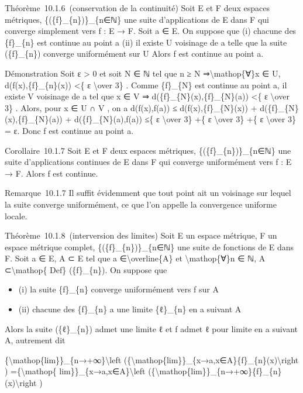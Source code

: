 \documentclass[]{article}
\begin{document}
Théorème~10.1.6~(conservation de la continuité) Soit E et F deux espaces
métriques, \{(\{f\}\_\{n\})\}\_\{n∈ℕ\} une suite d'applications de E
dans F qui converge simplement vers f : E → F. Soit a ∈ E. On suppose
que (i) chacune des \{f\}\_\{n\} est continue au point a (ii) il existe
U voisinage de a telle que la suite (\{f\}\_\{n\}) converge uniformément
sur U Alors f est continue au point a.

Démonstration Soit ε \textgreater{} 0 et soit N ∈ ℕ tel que n ≥ N
⇒\textbackslash{}mathop\{∀\}x ∈ U, d(f(x),\{f\}\_\{n\}(x)) \textless{}\{
ε \textbackslash{}over 3\} . Comme \{f\}\_\{N\} est continue au point a,
il existe V voisinage de a tel que x ∈ V ⇒
d(\{f\}\_\{N\}(x),\{f\}\_\{N\}(a)) \textless{}\{ ε \textbackslash{}over
3\} . Alors, pour x ∈ U ∩ V , on a d(f(x),f(a)) ≤
d(f(x),\{f\}\_\{N\}(x)) + d(\{f\}\_\{N\}(x),\{f\}\_\{N\}(a)) +
d(\{f\}\_\{N\}(a),f(a)) ≤\{ ε \textbackslash{}over 3\} +\{ ε
\textbackslash{}over 3\} +\{ ε \textbackslash{}over 3\} = ε. Donc f est
continue au point a.

Corollaire~10.1.7 Soit E et F deux espaces métriques,
\{(\{f\}\_\{n\})\}\_\{n∈ℕ\} une suite d'applications continues de E dans
F qui converge uniformément vers f : E → F. Alors f est continue.

Remarque~10.1.7 Il suffit évidemment que tout point ait un voisinage sur
lequel la suite converge uniformément, ce que l'on appelle la
convergence uniforme locale.

Théorème~10.1.8~(interversion des limites) Soit E un espace métrique, F
un espace métrique complet, \{(\{f\}\_\{n\})\}\_\{n∈ℕ\} une suite de
fonctions de E dans F. Soit a ∈ E, A ⊂ E tel que a
∈\textbackslash{}overline\{A\} et \textbackslash{}mathop\{∀\}n ∈ ℕ, A
⊂\textbackslash{}mathop\{ Def\} (\{f\}\_\{n\}). On suppose que

\begin{itemize}
\itemsep1pt\parskip0pt
\item
  (i) la suite \{f\}\_\{n\} converge uniformément vers f sur A
\item
  (ii) chacune des \{f\}\_\{n\} a une limite \{ℓ\}\_\{n\} en a suivant A
\end{itemize}

Alors la suite (\{ℓ\}\_\{n\}) admet une limite ℓ et f admet ℓ pour
limite en a suivant A, autrement dit

\{\textbackslash{}mathop\{lim\}\}\_\{n→+∞\}\textbackslash{}left
(\{\textbackslash{}mathop\{lim\}\}\_\{x→a,x∈A\}\{f\}\_\{n\}(x)\textbackslash{}right
) =\{\textbackslash{}mathop\{ lim\}\}\_\{x→a,x∈A\}\textbackslash{}left
(\{\textbackslash{}mathop\{lim\}\}\_\{n→+∞\}\{f\}\_\{n\}(x)\textbackslash{}right
)
\end{document}
